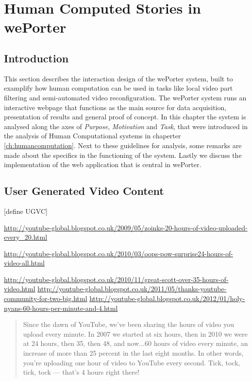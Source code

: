 \chapter{Human Computed Stories in wePorter}
\label{chap:weporter}

\section{Introduction}
This section describes the interaction design of the wePorter system, built to examplify how human computation can be used in tasks like local video part filtering and semi-automated video reconfiguration. The wePorter system runs an interactive webpage that functions as the main source for data acquisition, presentation of results and general proof of concept. In this chapter the system is analysed along the axes of \textit{Purpose}, \textit{Motivation} and \textit{Task}, that were introduced in the analysis of Human Computational systems in chaperter \ref{ch:humancomputation}. Next to these guidelines for analysis, some remarks are made about the specifics in the functioning of the system. Lastly we discuss the implementation of the web application that is central in wePorter.

\section{User Generated Video Content}

[define UGVC]

\url{http://youtube-global.blogspot.co.uk/2009/05/zoinks-20-hours-of-video-uploaded-every_20.html}

\url{http://youtube-global.blogspot.co.uk/2010/03/oops-pow-surprise24-hours-of-video-all.html}

\url{http://youtube-global.blogspot.co.uk/2010/11/great-scott-over-35-hours-of-video.html}
\url{http://youtube-global.blogspot.co.uk/2011/05/thanks-youtube-community-for-two-big.html}
\url{http://youtube-global.blogspot.co.uk/2012/01/holy-nyans-60-hours-per-minute-and-4.html}

\begin{quote}
  Since the dawn of YouTube, we’ve been sharing the hours of video you upload every minute. In 2007 we started at six hours, then in 2010 we were at 24 hours, then 35, then 48, and now...60 hours of video every minute, an increase of more than 25 percent in the last eight months. In other words, you’re uploading one hour of video to YouTube every second. Tick, tock, tick, tock — that’s 4 hours right there!
\end{quote}


